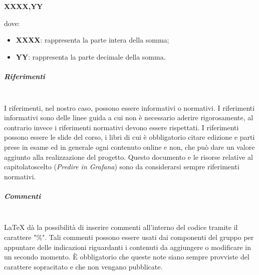                     \centerline{\textbf{XXXX,YY}} \newline \newline
                    dove:
                    \begin{itemize}
                        \item \textbf{XXXX}: rappresenta la parte intera della somma;
                        \item \textbf{YY}: rappresenta la parte decimale della somma.
                    \end{itemize}
                \subparagraph{Riferimenti}\mbox{}\\ [1mm]
                    I riferimenti, nel nostro caso, possono essere informativi o normativi. I riferimenti informativi sono delle linee guida a cui non è necessario aderire rigorosamente, al contrario invece i riferimenti normativi devono essere rispettati. I riferimenti possono essere le slide del corso, i libri di cui è obbligatorio citare edizione e parti prese in esame ed in generale ogni contenuto online e non, che può dare un valore aggiunto alla realizzazione del progetto\glo. Questo documento e le risorse relative al capitolato\glosp scelto (\textit{Predire in Grafana}) sono da considerarsi sempre riferimenti normativi.
                \subparagraph{Commenti}\mbox{}\\ [1mm]
                    \LaTeX\xspace dà la possibilità di inserire commenti all'interno del codice tramite il carattere "\%". Tali commenti possono essere usati dai componenti del gruppo per appuntare delle indicazioni riguardanti i contenuti da aggiungere o modificare in un secondo momento. È obbligatorio che queste note siano sempre provviste del carattere sopracitato e che non vengano pubblicate.
